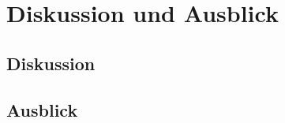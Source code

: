 \chapter{Diskussion und Ausblick}\label{chap:diskussion}

\section{Diskussion}\label{sub:diskussion}

\section{Ausblick}\label{sub:ausblick}